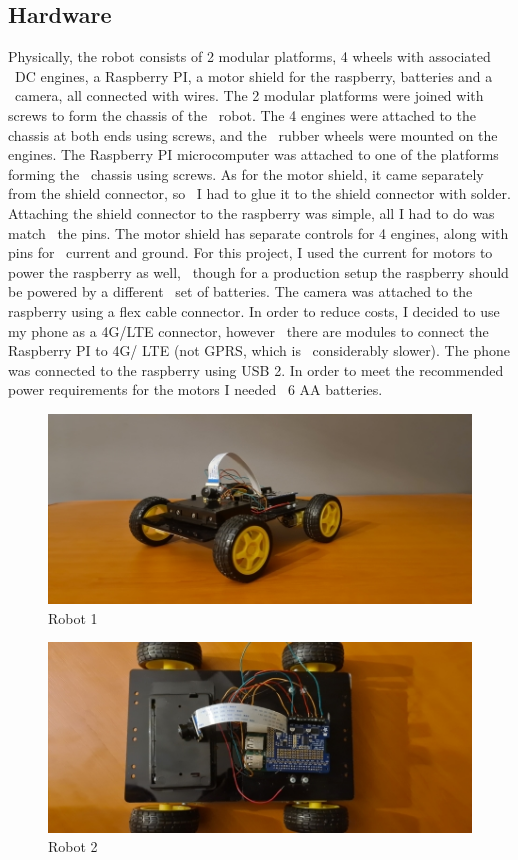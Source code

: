 \subsection{Hardware}
\label{subsec:implementation-robot-hardware}

Physically, the robot consists of 2 modular platforms, 4 wheels with associated \
DC engines, a Raspberry PI, a motor shield for the raspberry, batteries and a \
camera, all connected with wires.
The 2 modular platforms were joined with screws to form the chassis of the \
robot.
The 4 engines were attached to the chassis at both ends using screws, and the \
rubber wheels were mounted on the engines.
The Raspberry PI microcomputer was attached to one of the platforms forming the \
chassis using screws.
As for the motor shield, it came separately from the shield connector, so \
I had to glue it to the shield connector with solder.
Attaching the shield connector to the raspberry was simple, all I had to do was match \
the pins.
The motor shield has separate controls for 4 engines, along with pins for \
current and ground.
For this project, I used the current for motors to power the raspberry as well, \
though for a production setup the raspberry should be powered by a different \
set of batteries.
The camera was attached to the raspberry using a flex cable connector.
In order to reduce costs, I decided to use my phone as a 4G/LTE connector, however \
there are modules to connect the Raspberry PI to 4G/ LTE (not GPRS, which is \
considerably slower).
The phone was connected to the raspberry using USB 2.
In order to meet the recommended power requirements for the motors I needed \
6 AA batteries.

\begin{figure}[ht]
    \label{fig:robot1}
    \centering
    \includegraphics[keepaspectratio]{img/robot1d.jpg}
    \caption{Robot 1}
\end{figure}

\begin{figure}[ht]
    \label{fig:robot2}
    \includegraphics[keepaspectratio]{img/robot2d.jpg}
    \caption{Robot 2}
\end{figure}


